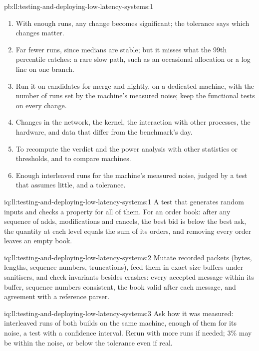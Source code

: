 \begin{solution}{pb:ll:testing-and-deploying-low-latency-systems:1}
\begin{enumerate}
\item With enough runs, any change becomes significant; the tolerance says which changes matter.
\item Far fewer runs, since medians are stable; but it misses what the 99th percentile catches: a rare slow path, such as an
occasional allocation or a log line on one branch.
\item Run it on candidates for merge and nightly, on a dedicated machine, with the number of runs set by the machine's
measured noise; keep the functional tests on every change.
\item Changes in the network, the kernel, the interaction with other processes, the hardware, and data that differ from the
benchmark's day.
\item To recompute the verdict and the power analysis with other statistics or thresholds, and to compare machines.
\item Enough interleaved runs for the machine's measured noise, judged by a test that assumes little, and a tolerance.
\end{enumerate}
\end{solution}

\begin{solution}{iq:ll:testing-and-deploying-low-latency-systems:1}
A test that generates random inputs and checks a property for all of them. For an order book: after any sequence of adds,
modifications and cancels, the best bid is below the best ask, the quantity at each level equals the sum of its orders, and
removing every order leaves an empty book.
\end{solution}

\begin{solution}{iq:ll:testing-and-deploying-low-latency-systems:2}
Mutate recorded packets (bytes, lengths, sequence numbers, truncations), feed them in exact-size buffers under sanitisers, and
check invariants besides crashes: every accepted message within its buffer, sequence numbers consistent, the book valid after
each message, and agreement with a reference parser.
\end{solution}

\begin{solution}{iq:ll:testing-and-deploying-low-latency-systems:3}
Ask how it was measured: interleaved runs of both builds on the same machine, enough of them for its noise, a test with a
confidence interval. Rerun with more runs if needed; 3\% may be within the noise, or below the tolerance even if real.
\end{solution}

